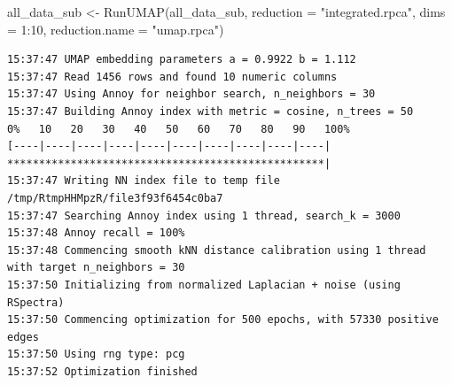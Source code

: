 \documentclass[
  letterpaper,
  DIV=11,
  numbers=noendperiod]{scrreprt}
\newenvironment{Shaded}{\begin{snugshade}}{\end{snugshade}}
\newcommand{\AttributeTok}[1]{\textcolor[rgb]{0.40,0.45,0.13}{#1}}
\newcommand{\DecValTok}[1]{\textcolor[rgb]{0.68,0.00,0.00}{#1}}
\newcommand{\FunctionTok}[1]{\textcolor[rgb]{0.28,0.35,0.67}{#1}}
\newcommand{\NormalTok}[1]{\textcolor[rgb]{0.00,0.23,0.31}{#1}}
\newcommand{\OtherTok}[1]{\textcolor[rgb]{0.00,0.23,0.31}{#1}}
\newcommand{\SpecialCharTok}[1]{\textcolor[rgb]{0.37,0.37,0.37}{#1}}
\newcommand{\StringTok}[1]{\textcolor[rgb]{0.13,0.47,0.30}{#1}}
\begin{document}
\begin{Shaded}
\begin{Highlighting}[]
\NormalTok{all\_data\_sub }\OtherTok{\textless{}{-}} \FunctionTok{RunUMAP}\NormalTok{(all\_data\_sub, }\AttributeTok{reduction =} \StringTok{"integrated.rpca"}\NormalTok{, }\AttributeTok{dims =} \DecValTok{1}\SpecialCharTok{:}\DecValTok{10}\NormalTok{, }\AttributeTok{reduction.name =} \StringTok{"umap.rpca"}\NormalTok{)}
\end{Highlighting}
\end{Shaded}

\begin{verbatim}
15:37:47 UMAP embedding parameters a = 0.9922 b = 1.112
15:37:47 Read 1456 rows and found 10 numeric columns
15:37:47 Using Annoy for neighbor search, n_neighbors = 30
15:37:47 Building Annoy index with metric = cosine, n_trees = 50
0%   10   20   30   40   50   60   70   80   90   100%
[----|----|----|----|----|----|----|----|----|----|
**************************************************|
15:37:47 Writing NN index file to temp file /tmp/RtmpHHMpzR/file3f93f6454c0ba7
15:37:47 Searching Annoy index using 1 thread, search_k = 3000
15:37:48 Annoy recall = 100%
15:37:48 Commencing smooth kNN distance calibration using 1 thread with target n_neighbors = 30
15:37:50 Initializing from normalized Laplacian + noise (using RSpectra)
15:37:50 Commencing optimization for 500 epochs, with 57330 positive edges
15:37:50 Using rng type: pcg
15:37:52 Optimization finished
\end{verbatim}
\end{document}
